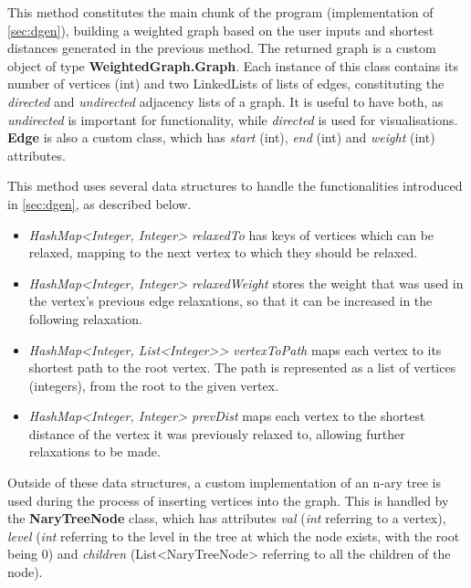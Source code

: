 \documentclass{l4proj}
\begin{document}
This method constitutes the main chunk of the program (implementation of \autoref{sec:dgen}), building a weighted graph based on the user inputs and shortest distances generated in the previous method. The returned graph is a custom object of type \textbf{WeightedGraph.Graph}. Each instance of this class contains its number of vertices (int) and two LinkedLists of lists of edges, constituting the \emph{directed} and \emph{undirected} adjacency lists of a graph. It is useful to have both, as \emph{undirected} is important for functionality, while \emph{directed} is used for visualisations. \textbf{Edge} is also a custom class, which has \emph{start} (int), \emph{end} (int) and \emph{weight} (int) attributes.

This method uses several data structures to handle the functionalities introduced in \autoref{sec:dgen}, as described below.
\begin{itemize}
	\item
	\emph{HashMap<Integer, Integer> relaxedTo} has keys of vertices which can be relaxed, mapping to the next vertex to which they should be relaxed.
	\item
	\emph{HashMap<Integer, Integer> relaxedWeight} stores the weight that was used in the vertex's previous edge relaxations, so that it can be increased in the following relaxation.
	\item
	\emph{HashMap<Integer, List<Integer>> vertexToPath} maps each vertex to its shortest path to the root vertex. The path is represented as a list of vertices (integers), from the root to the given vertex.
	\item
	\emph{HashMap<Integer, Integer> prevDist} maps each vertex to the shortest distance of the vertex it was previously relaxed to, allowing further relaxations to be made.
\end{itemize}

Outside of these data structures, a custom implementation of an n-ary tree is used during the process of inserting vertices into the graph. This is handled by the \textbf{NaryTreeNode} class, which has attributes \emph{val} (\emph{int} referring to a vertex), \emph{level} (\emph{int} referring to the level in the tree at which the node exists, with the root being $0$) and \emph{children} (List<NaryTreeNode> referring to all the children of the node). 
\end{document}
